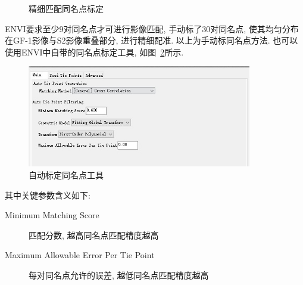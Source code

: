 \begin{figure}[!htbp]
    \centering
    \qquad
    \caption{精细匹配同名点标定}
    \label{fig:0211}
\end{figure}

ENVI要求至少9对同名点才可进行影像匹配, 手动标了30对同名点, 使其均匀分布在GF-1影像与S2影像重叠部分, 进行精细配准. 以上为手动标同名点方法. 也可以使用ENVI中自带的同名点标定工具, 如图~\ref{fig:0212}所示.

\begin{figure}[!htbp]
    \centering
    \includegraphics[height=12em]{pic/q4_03.jpg}
    \caption{自动标定同名点工具}
    \label{fig:0212}
\end{figure}

其中关键参数含义如下:
\begin{description}
    \item[Minimum Matching Score] 匹配分数, 越高同名点匹配精度越高
    \item[Maximum Allowable Error Per Tie Point] 每对同名点允许的误差, 越低同名点匹配精度越高 
\end{description}

